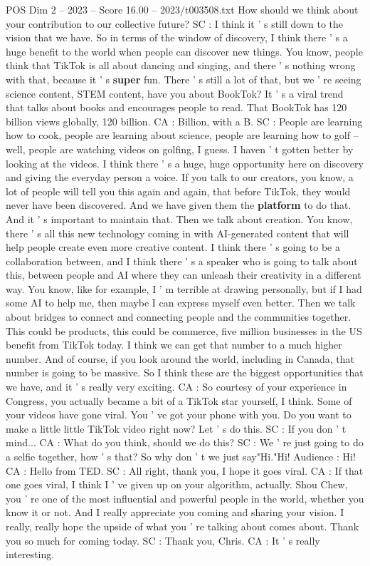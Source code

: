 \begin{textsample}{POS Dim 2 – 2023 – Score 16.00 – 2023/t003508.txt}
How should we think about your contribution to our collective future?
SC : I think it ' s still down to the vision that we have.
So in terms of the window of discovery, I think there ' s a huge benefit to the world when people can discover new things.
You know, people think that TikTok is all about dancing and singing, and there ' s nothing wrong with that, because it ' s \textbf{super} fun.
There ' s still a lot of that, but we ' re seeing science content, STEM content, have you about BookTok?
It ' s a viral trend that talks about books and encourages people to read.
That BookTok has 120 billion views globally, 120 billion.
CA : Billion, with a B.
SC : People are learning how to cook, people are learning about science, people are learning how to golf -- well, people are watching videos on golfing, I guess.
I haven ' t gotten better by looking at the videos.
I think there ' s a huge, huge opportunity here on discovery and giving the everyday person a voice.
If you talk to our creators, you know, a lot of people will tell you this again and again, that before TikTok, they would never have been discovered.
And we have given them the \textbf{platform} to do that.
And it ' s important to maintain that.
Then we talk about creation.
You know, there ' s all this new technology coming in with AI-generated content that will help people create even more creative content.
I think there ' s going to be a collaboration between, and I think there ' s a speaker who is going to talk about this, between people and AI where they can unleash their creativity in a different way.
You know, like for example, I ' m terrible at drawing personally, but if I had some AI to help me, then maybe I can express myself even better.
Then we talk about bridges to connect and connecting people and the communities together.
This could be products, this could be commerce, five million businesses in the US benefit from TikTok today.
I think we can get that number to a much higher number.
And of course, if you look around the world, including in Canada, that number is going to be massive.
So I think these are the biggest opportunities that we have, and it ' s really very exciting.
CA : So courtesy of your experience in Congress, you actually became a bit of a TikTok star yourself, I think.
Some of your videos have gone viral.
You ' ve got your phone with you.
Do you want to make a little little TikTok video right now?
Let ' s do this.
SC : If you don ' t mind...
CA : What do you think, should we do this?
SC : We ' re just going to do a selfie together, how ' s that?
So why don ' t we just say"Hi."Hi!
Audience : Hi!
CA : Hello from TED.
SC : All right, thank you, I hope it goes viral.
CA : If that one goes viral, I think I ' ve given up on your algorithm, actually.
Shou Chew, you ' re one of the most influential and powerful people in the world, whether you know it or not.
And I really appreciate you coming and sharing your vision.
I really, really hope the upside of what you ' re talking about comes about.
Thank you so much for coming today.
SC : Thank you, Chris.
CA : It ' s really interesting.

\end{textsample}
